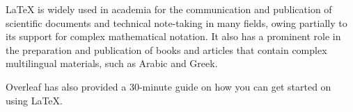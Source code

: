 LaTeX is widely used in academia for the communication and publication of scientific documents and technical note-taking in many fields,
owing partially to its support for complex mathematical notation. It also has a prominent role in the preparation and publication of books and articles
that contain complex multilingual materials, such as Arabic and Greek.

Overleaf has also provided a 30-minute guide on how you can get started on using \LaTeX. \cite{overleaf:learnlatex}
